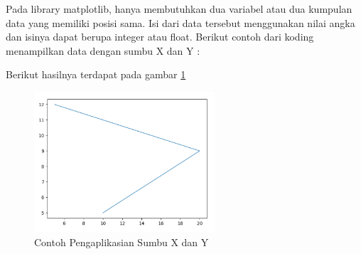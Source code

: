Pada library matplotlib, hanya membutuhkan dua variabel atau dua kumpulan data yang memiliki posisi sama. Isi dari data tersebut menggunakan nilai angka dan isinya dapat berupa integer atau float. Berikut contoh dari koding menampilkan data dengan sumbu X dan Y : 

Berikut hasilnya terdapat pada gambar \ref{Contoh_Soal2}
\begin{figure} [ht]
	\centerline{\includegraphics[width=0.6\textwidth]{figures/6/1174035/Teori/Soal2.png}}
	\caption{Contoh Pengaplikasian Sumbu X dan Y}
	\label{Contoh_Soal2}
\end{figure}

